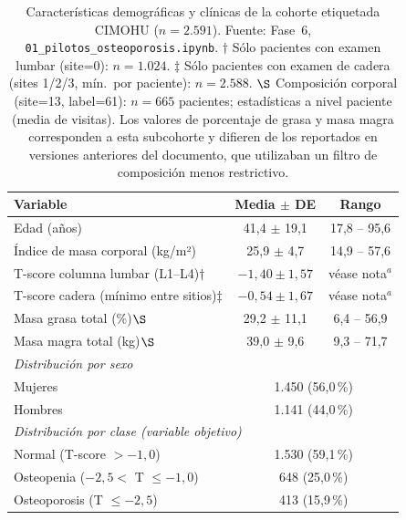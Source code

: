 \documentclass[../tesis.tex]{subfiles}
\begin{document}
\begin{table}[h]
\centering
\caption[Características demográficas y clínicas de la cohorte etiquetada CIMOHU]{Características demográficas y clínicas de la cohorte etiquetada CIMOHU ($n = 2.591$).
Fuente: Fase~6, \texttt{01\_pilotos\_osteoporosis.ipynb}. $\dagger$ Sólo pacientes con examen lumbar (site=0): $n = 1.024$.
$\ddagger$ Sólo pacientes con examen de cadera (sites 1/2/3, mín.\ por paciente): $n = 2.588$.
$\S$ Composición corporal (site=13, label=61): $n = 665$ pacientes; estadísticas a nivel paciente (media de visitas). Los valores de porcentaje de grasa y masa magra corresponden a esta subcohorte y difieren de los reportados en versiones anteriores del documento, que utilizaban un filtro de composición menos restrictivo.}
\label{tab:demograficos}
\begin{tabular}{lcc}
\toprule
\textbf{Variable} & \textbf{Media $\pm$ DE} & \textbf{Rango} \\
\midrule
Edad (años)                            & 41{,}4 $\pm$ 19{,}1   & 17{,}8 -- 95{,}6 \\
Índice de masa corporal (kg/m²)         & 25{,}9 $\pm$ 4{,}7    & 14{,}9 -- 57{,}6 \\
T-score columna lumbar (L1--L4)$\dagger$  & $-1{,}40 \pm 1{,}57$  & véase nota$^{a}$ \\
T-score cadera (mínimo entre sitios)$\ddagger$ & $-0{,}54 \pm 1{,}67$ & véase nota$^{a}$ \\
Masa grasa total (\%)$\S$              & 29{,}2 $\pm$ 11{,}1   & 6{,}4 -- 56{,}9 \\
Masa magra total (kg)$\S$              & 39{,}0 $\pm$ 9{,}6    & 9{,}3 -- 71{,}7 \\
\midrule
\multicolumn{3}{l}{\textit{Distribución por sexo}} \\
Mujeres                                & \multicolumn{2}{c}{1.450 (56{,}0\,\%)} \\
Hombres                                & \multicolumn{2}{c}{1.141 (44{,}0\,\%)} \\
\midrule
\multicolumn{3}{l}{\textit{Distribución por clase (variable objetivo)}} \\
Normal (T-score $> -1{,}0$)            & \multicolumn{2}{c}{1.530 (59{,}1\,\%)} \\
Osteopenia ($-2{,}5 <$ T $\leq -1{,}0$) & \multicolumn{2}{c}{648 (25{,}0\,\%)} \\
Osteoporosis (T $\leq -2{,}5$)         & \multicolumn{2}{c}{413 (15{,}9\,\%)} \\
\bottomrule
\end{tabular}
\end{table}
\end{document}
